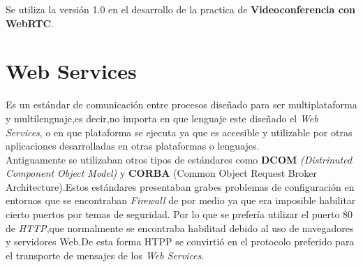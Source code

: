 Se utiliza la versión 1.0 en el desarrollo de la practica de \textbf{Videoconferencia con WebRTC}.
\section{Web Services}
Es un estándar de comunicación entre procesos diseñado para ser multiplataforma y multilenguaje,es decir,no importa en que lenguaje este diseñado el \textit{Web Services}\cite{webservices}, o en que plataforma se ejecuta ya que es accesible y utilizable por otras aplicaciones desarrolladas en otras plataformas o lenguajes.
\\Antiguamente se utilizaban otros tipos de estándares como \textbf{DCOM} \textit{(Distrinuted Component Object Model)} y \textbf{CORBA} (Common Object Request Broker Architecture).Estos estándares presentaban grabes problemas de configuración en entornos que se encontraban \textit{Firewall} de por medio ya que era imposible habilitar cierto puertos por temas de seguridad.
Por lo que se prefería utilizar el puerto 80 de \textit{HTTP},que normalmente se encontraba habilitad debido al uso de navegadores y servidores Web.De esta forma HTPP se convirtió en el protocolo preferido para el transporte de mensajes de los \textit{Web Services}.
